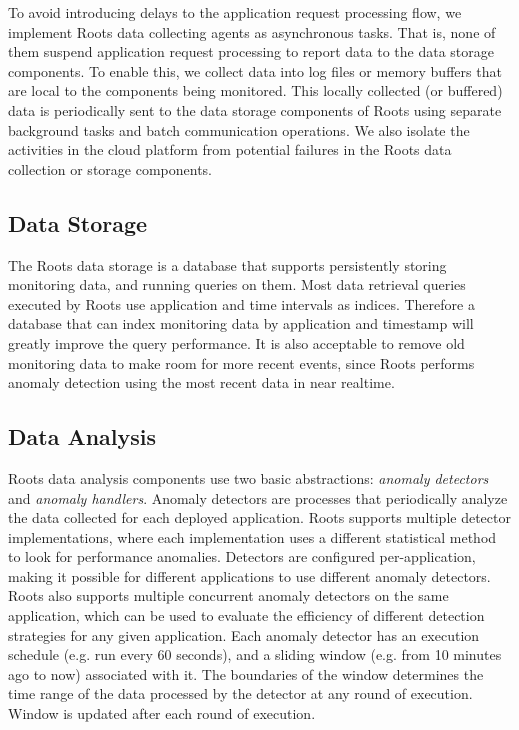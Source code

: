 To avoid introducing delays to the application request processing flow, we implement
Roots data collecting agents as asynchronous tasks. That is, none of them 
suspend application request processing to report data to the data storage components.
To enable this, we collect data into log files or memory buffers that are local to the 
components being monitored. This locally collected (or buffered) data is periodically sent
to the data storage components of Roots using separate background tasks and batch communication
operations. We also isolate the activities in the cloud platform from potential
failures in the Roots data collection or storage components.

\subsection{Data Storage}

The Roots data storage is a database that supports persistently storing monitoring data, and running
queries on them.  
Most data retrieval queries executed
by Roots use application and time intervals as indices. Therefore a database that can index monitoring
data by application and timestamp will greatly improve the query performance.
It is also acceptable to remove old monitoring data to make room for more recent events, since Roots
performs anomaly detection using the most recent data in near realtime.

\subsection{Data Analysis}

Roots data analysis components use two basic abstractions: \textit{anomaly detectors} 
and \textit{anomaly handlers}.
Anomaly detectors are processes that periodically analyze the data collected for
each deployed application. Roots supports multiple detector implementations, where each implementation
uses a different statistical method to look for performance anomalies. Detectors are configured
per-application, making it possible for different applications to use different anomaly 
detectors. Roots also supports multiple concurrent anomaly detectors on the same application, which can be used
to evaluate the efficiency of different detection strategies for any given application. Each
anomaly detector has an execution schedule (e.g. run every 60 seconds), and a sliding window 
(e.g. from 10 minutes ago to now)
associated with it. The boundaries of the window determines the time range
of the data processed by the detector at any round of execution. Window is updated 
after each round of execution. 

